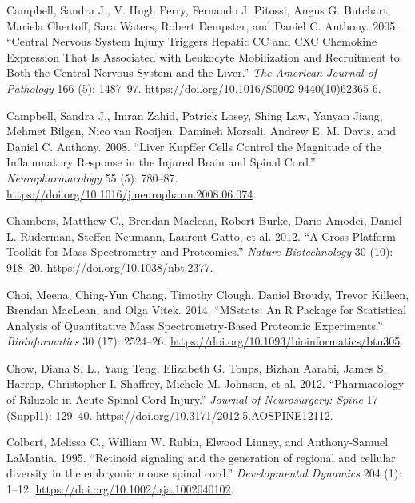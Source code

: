 \documentclass[
]{article}
\newlength{\cslhangindent}
\newlength{\cslentryspacingunit} %
\newenvironment{CSLReferences}[2] %
 {%
  \setlength{\parindent}{0pt}
  \ifodd #1
  \let\oldpar\par
  \def\par{\hangindent=\cslhangindent\oldpar}
  \fi
  \setlength{\parskip}{#2\cslentryspacingunit}
 }%
 {}
\begin{document}
\begin{landscape}
\begin{landscape}
\begin{CSLReferences}{1}{0}
\leavevmode{}%
Campbell, Sandra J., V. Hugh Perry, Fernando J. Pitossi, Angus G. Butchart, Mariela Chertoff, Sara Waters, Robert Dempster, and Daniel C. Anthony. 2005. {``Central {Nervous System Injury Triggers Hepatic CC} and {CXC Chemokine Expression} That {Is Associated} with {Leukocyte Mobilization} and {Recruitment} to {Both} the {Central Nervous System} and the {Liver}.''} \emph{The American Journal of Pathology} 166 (5): 1487--97. \url{https://doi.org/10.1016/S0002-9440(10)62365-6}.

\leavevmode{}%
Campbell, Sandra J., Imran Zahid, Patrick Losey, Shing Law, Yanyan Jiang, Mehmet Bilgen, Nico van Rooijen, Damineh Morsali, Andrew E. M. Davis, and Daniel C. Anthony. 2008. {``Liver {Kupffer} Cells Control the Magnitude of the Inflammatory Response in the Injured Brain and Spinal Cord.''} \emph{Neuropharmacology} 55 (5): 780--87. \url{https://doi.org/10.1016/j.neuropharm.2008.06.074}.

\leavevmode{}%
Chambers, Matthew C., Brendan Maclean, Robert Burke, Dario Amodei, Daniel L. Ruderman, Steffen Neumann, Laurent Gatto, et al. 2012. {``A Cross-Platform Toolkit for Mass Spectrometry and Proteomics.''} \emph{Nature Biotechnology} 30 (10): 918--20. \url{https://doi.org/10.1038/nbt.2377}.

\leavevmode{}%
Choi, Meena, Ching-Yun Chang, Timothy Clough, Daniel Broudy, Trevor Killeen, Brendan MacLean, and Olga Vitek. 2014. {``{MSstats}: An {R} Package for Statistical Analysis of Quantitative Mass Spectrometry-Based Proteomic Experiments.''} \emph{Bioinformatics} 30 (17): 2524--26. \url{https://doi.org/10.1093/bioinformatics/btu305}.

\leavevmode{}%
Chow, Diana S. L., Yang Teng, Elizabeth G. Toups, Bizhan Aarabi, James S. Harrop, Christopher I. Shaffrey, Michele M. Johnson, et al. 2012. {``Pharmacology of Riluzole in Acute Spinal Cord Injury.''} \emph{Journal of Neurosurgery: Spine} 17 (Suppl1): 129--40. \url{https://doi.org/10.3171/2012.5.AOSPINE12112}.

\leavevmode{}%
Colbert, Melissa C., William W. Rubin, Elwood Linney, and Anthony-Samuel LaMantia. 1995. {``{Retinoid signaling and the generation of regional and cellular diversity in the embryonic mouse spinal cord}.''} \emph{Developmental Dynamics} 204 (1): 1--12. \url{https://doi.org/10.1002/aja.1002040102}.


\end{CSLReferences}
\end{landscape}
\end{landscape}
\end{document}

